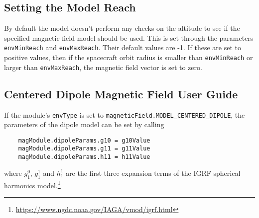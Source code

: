 \subsection{Setting the Model Reach}
By default the model doesn't perform any checks on the altitude to see if the specified magnetic field model should be used.  This is set through the parameters {\tt envMinReach} and {\tt envMaxReach}.  Their default values are -1.  If these are set to positive values, then if the spacecraft orbit radius is smaller than {\tt envMinReach} or larger than {\tt envMaxReach}, the magnetic field vector is set to zero.


\subsection{Centered Dipole Magnetic Field User Guide}
If the module's \verb|envType| is set to {\tt magneticField.MODEL\_CENTERED\_DIPOLE}, the parameters of the dipole model can be set by calling
\begin{verbatim}
    magModule.dipoleParams.g10 = g10Value
    magModule.dipoleParams.g11 = g11Value
    magModule.dipoleParams.h11 = h11Value
\end{verbatim}
where $g_{1}^{0}$, $g_{1}^{1}$ and $h_{1}^{1}$ are the first three expansion terms of the IGRF spherical harmonics model.\footnote{\url{https://www.ngdc.noaa.gov/IAGA/vmod/igrf.html}}